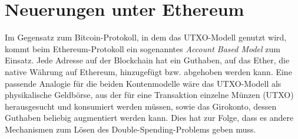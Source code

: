 \section{Neuerungen unter Ethereum}
Im Gegensatz zum Bitcoin-Protokoll, in dem das UTXO-Modell genutzt wird, kommt beim Ethereum-Protokoll ein sogenanntes \emph{Account Based Model} zum Einsatz. Jede Adresse auf der Blockchain hat ein Guthaben, auf das Ether, die native Währung auf Ethereum, hinzugefügt bzw. abgehoben werden kann. Eine passende Analogie für die beiden Kontenmodelle wäre das UTXO-Modell als physikalische Geldbörse, aus der für eine Transaktion einzelne Münzen (UTXO) herausgesucht und konsumiert werden müssen, sowie das Girokonto, dessen Guthaben beliebig augmentiert werden kann. Dies hat zur Folge, dass es andere Mechanismen zum Lösen des Double-Spending-Problems geben muss.

